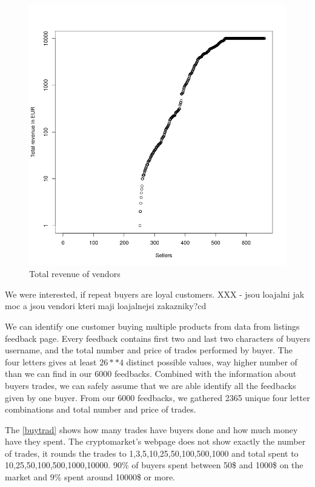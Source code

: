 \documentclass[
  digital, %
  table,   %
  lof,     %
  lot,     %
  oneside
]{fithesis3}
\begin{document}
\begin{figure}[!htb]
    \centering
    \includegraphics[scale=0.4]{total-rev}
    \caption{Total revenue of vendors}
    \label{Vendors by total revenue}
\end{figure}


We were interested, if repeat buyers are loyal customers.
XXX - jsou loajalni jak moc a jsou vendori kteri maji loajalnejsi zakazniky?cd 


We can identify one customer buying multiple products from data from listings feedback page.
Every feedback contains first two and last two characters of buyers username,
and the total number and price of trades performed by buyer.
The four letters gives at least $26**4$ distinct possible values, way higher number of 
than we can find in our 6000 feedbacks. Combined with the information
about buyers trades, we can safely assume that we are able identify
all the feedbacks given by one buyer.
From our 6000 feedbacks, we gathered 2365 unique four letter combinations
and total number and price of trades.

The \ref{buytrad} shows how many trades have buyers done and how much money have they spent.
The cryptomarket's webpage does not show exactly the number of trades, it rounds the trades
to 1,3,5,10,25,50,100,500,1000 and total spent to 10,25,50,100,500,1000,10000.
90\% of buyers spent between 50\$ and 1000\$ on the market and 9\% spent around 10000\$ or more.
\end{document}
